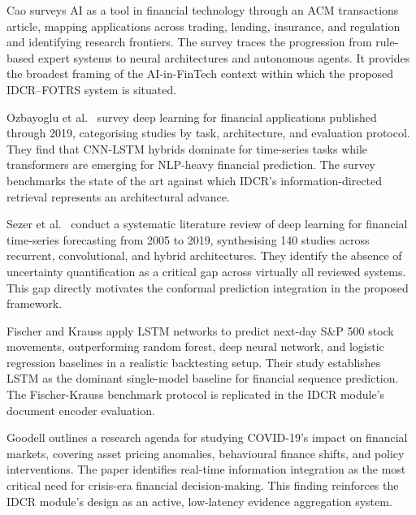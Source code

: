 \documentclass[12pt,a4paper,oneside]{report}
\theoremstyle{definition}
\theoremstyle{remark}
\begin{document}
\medskip

\noindent Cao \cite{Cao2022AIQuantFinance} surveys AI as a tool in financial technology through an ACM transactions article, mapping applications across trading, lending, insurance, and regulation and identifying research frontiers. The survey traces the progression from rule-based expert systems to neural architectures and autonomous agents. It provides the broadest framing of the AI-in-FinTech context within which the proposed IDCR--FOTRS system is situated.

\medskip

\noindent Ozbayoglu et al.\ \cite{Ozbayoglu2020DLFinance} survey deep learning for financial applications published through 2019, categorising studies by task, architecture, and evaluation protocol. They find that CNN-LSTM hybrids dominate for time-series tasks while transformers are emerging for NLP-heavy financial prediction. The survey benchmarks the state of the art against which IDCR's information-directed retrieval represents an architectural advance.

\medskip

\noindent Sezer et al.\ \cite{Sezer2020FTSFSurvey} conduct a systematic literature review of deep learning for financial time-series forecasting from 2005 to 2019, synthesising 140 studies across recurrent, convolutional, and hybrid architectures. They identify the absence of uncertainty quantification as a critical gap across virtually all reviewed systems. This gap directly motivates the conformal prediction integration in the proposed framework.

\medskip

\noindent Fischer and Krauss \cite{Fischer2018LSTMStock} apply LSTM networks to predict next-day S\&P 500 stock movements, outperforming random forest, deep neural network, and logistic regression baselines in a realistic backtesting setup. Their study establishes LSTM as the dominant single-model baseline for financial sequence prediction. The Fischer-Krauss benchmark protocol is replicated in the IDCR module's document encoder evaluation.

\medskip

\noindent Goodell \cite{Goodell2020COVIDFinance} outlines a research agenda for studying COVID-19's impact on financial markets, covering asset pricing anomalies, behavioural finance shifts, and policy interventions. The paper identifies real-time information integration as the most critical need for crisis-era financial decision-making. This finding reinforces the IDCR module's design as an active, low-latency evidence aggregation system.
\end{document}
